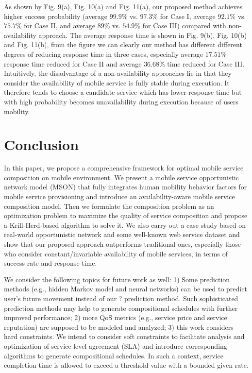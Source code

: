 \documentclass[journal]{IEEEtran}
\begin{document}
As shown by Fig. 9(a), Fig. 10(a) and Fig. 11(a), our proposed method achieves higher success probability (average $99.9\%$ vs. $97.3\%$ for Case I, average $92.1\%$ vs. $75.7\%$ for Case II, and average $89\%$ vs. $54.9\%$ for Case III) compared with non-availability approach.
The average response time is shown in Fig. 9(b), Fig. 10(b) and Fig. 11(b), from the figure we can clearly our method has different different degrees of reducing response time in three cases, especially average $17.51\%$ response time reduced for Case II and average $36.68\%$ time reduced for Case III. Intuitively, the disadvantage of a non-availability approaches lie in that they consider the availability of mobile service is fully stable during execution. It therefore tends to choose a candidate service which has lower response time but with high probability becomes unavailability during execution because of users mobility.

\section{Conclusion}
In this paper, we propose a comprehensive framework for optimal mobile service composition on mobile environment. We present a mobile service opportunistic network model (MSON) that fully integrates human mobility behavior factors for mobile service provisioning and introduce an availability-aware mobile service composition model. Then we formulate the composition problem as an optimization problem to maximize the quality of service composition and propose a Krill-Herd-based algorithm to solve it. We also carry out a case study based on real-world opportunistic network and some well-known web service dataset and show that our proposed approach outperforms traditional ones, especially those who consider constant/invariable availability of mobile services, in terms of success rate and response time.

We consider the following topics for future work as well: 1) Some prediction methods (e.g., hidden Markov model and neural networks) can be used to predict user's future movement instead of our ? prediction method. Such sophisticated prediction methods may help to generate compositional schedules with further improved performance; 2) more QoS metrics (e.g., service price and service reputation) are supposed to be modeled and  analyzed; 3) this work considers hard constraints.
We intend to consider soft constraints to facilitate analysis and optimization of service-level-agreement (SLA) and introduce corresponding algorithms to generate compositional schedules. In such a context, service completion time is allowed to exceed a threshold value with a bounded given rate. 



\ifCLASSOPTIONcaptionsoff
  \newpage
\fi






\end{document}
